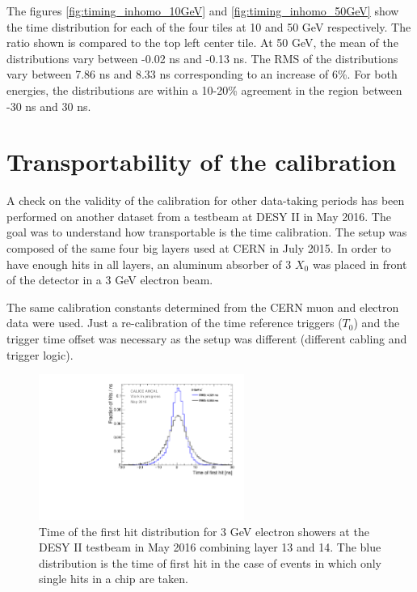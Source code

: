 The figures \ref{fig:timing_inhomo_10GeV} and \ref{fig:timing_inhomo_50GeV} show the time distribution for each of the four tiles at 10 and 50 GeV respectively. The ratio shown is compared to the top left center tile. At 50 GeV, the mean of the distributions vary between -0.02 ns and -0.13 ns. The RMS of the distributions vary between 7.86 ns and 8.33 ns corresponding to an increase of 6\%. For both energies, the distributions are within a 10-20\% agreement in the region between -30 ns and 30 ns.

\section{Transportability of the calibration}

A check on the validity of the calibration for other data-taking periods has been performed on another dataset from a testbeam at DESY II in May 2016. The goal was to understand how transportable is the time calibration. The setup was composed of the same four big layers used at CERN in July 2015. In order to have enough hits in all layers, an aluminum absorber of 3 $X_{0}$ was placed in front of the detector in a 3 GeV electron beam.

The same calibration constants determined from the CERN muon and electron data were used. Just a re-calibration of the time reference triggers ($T_{0}$) and the trigger time offset was necessary as the setup was different (different cabling and trigger logic).

\begin{figure}[htbp!]
	\centering
	\includegraphics[width=0.6\textwidth]{../Thesis_Plots/Timing/Electrons/Plots/Timing_May2016_BigLayers.pdf}
	\caption{Time of the first hit distribution for 3 GeV electron showers at the DESY II testbeam in May 2016 combining layer 13 and 14. The blue distribution is the time of first hit in the case of events in which only single hits in a chip are taken.}\label{fig:TBMay2016}
\end{figure}

